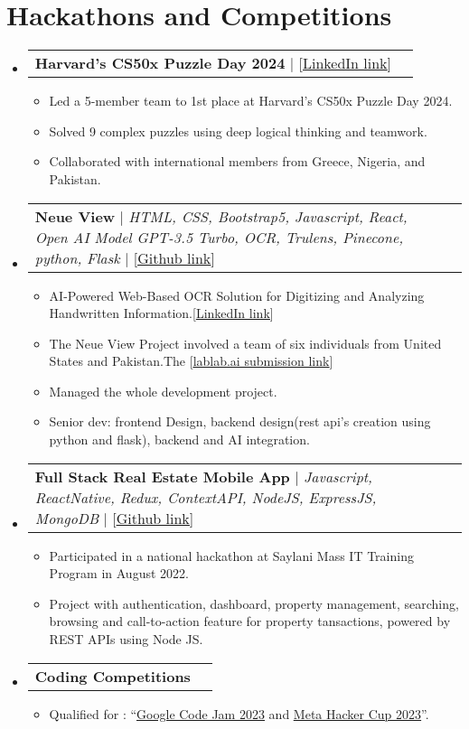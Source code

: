 \documentclass[letterpaper,11pt]{article}
\makeatletter
\newcommand{\resumeItem}[1]{
  \item\small{
    {#1 \vspace{-2pt}}
  }
}
\newcommand{\resumeProjectHeading}[2]{
    \item
    \begin{tabular*}{0.97\textwidth}{l@{\extracolsep{\fill}}r}
      \small#1 & #2 \\
    \end{tabular*}\vspace{-7pt}
}
\newcommand{\resumeSubHeadingListStart}{\begin{itemize}[leftmargin=0.15in, label={}]}
\newcommand{\resumeSubHeadingListEnd}{\end{itemize}}
\newcommand{\resumeItemListStart}{\begin{itemize}}
\newcommand{\resumeItemListEnd}{\end{itemize}\vspace{-5pt}}
\makeatother
\begin{document}
\section{\textbf{Hackathons and Competitions}}
\resumeSubHeadingListStart
\resumeProjectHeading
{\textbf{{Harvard's CS50x Puzzle Day 2024}} $|$ [{\href{https://www.linkedin.com/feed/update/urn:li:activity:7184212040717131778/}{\underline{LinkedIn link}}}]}{}
\resumeItemListStart
\resumeItem{Led a 5-member team to 1st place at Harvard's CS50x Puzzle Day 2024.}
\resumeItem{Solved 9 complex puzzles using deep logical thinking and teamwork.}
\resumeItem{Collaborated with international members from Greece, Nigeria, and Pakistan.}
\resumeItemListEnd
\resumeProjectHeading
{\textbf{{Neue View}} $|$ \emph{HTML, CSS, Bootstrap5, Javascript, React, Open AI Model GPT-3.5 Turbo, OCR, Trulens, Pinecone, python, Flask} $|$ [{\href{https://github.com/Ahmadjajja/neue-view}{\underline{Github link}}}]} {}
\resumeItemListStart
\resumeItem{AI-Powered Web-Based OCR Solution for Digitizing and Analyzing Handwritten Information.[{\href{https://www.linkedin.com/feed/update/urn:li:activity:7167991035099385856/}{\underline{LinkedIn link}}}]}
\resumeItem{The Neue View Project involved a team of six individuals from United States and Pakistan.The [{\href{https://lablab.ai/event/gpt-4-powered-app-creation-hackathon/neue-view/neue-view}{\underline{lablab.ai submission link}}}]}
\resumeItem{Managed the whole development project.}
\resumeItem{Senior dev: frontend Design, backend design(rest api's creation using python and flask), backend and AI integration.}
\resumeItemListEnd
\resumeProjectHeading
{\textbf{{Full Stack Real Estate Mobile App}} $|$ \emph{Javascript, ReactNative, Redux, ContextAPI, NodeJS,
    ExpressJS, MongoDB} $|$ [{\href{https://github.com/Ahmadjajja/Social_Real_Estate_System_Mobile_App_Frontend}{\underline{Github link}}}]}{}
\resumeItemListStart
\resumeItem{Participated in a national hackathon at Saylani Mass IT Training Program in August 2022.}
\resumeItem{Project with authentication, dashboard, property
  management, searching, browsing and call-to-action feature for property
  tansactions, powered by REST APIs using Node JS.}
\resumeItemListEnd
\resumeProjectHeading
{\textbf{{Coding Competitions}}}{}
\resumeItemListStart
\resumeItem{Qualified for : “{\href{https://www.linkedin.com/feed/update/urn:li:activity:7053083509342576640/}{\underline{Google Code Jam 2023}}} and {\href{https://github.com/Ahmadjajja/MetaHackerCup2023}{\underline{Meta Hacker Cup 2023}}}”.}
\resumeItemListEnd
\resumeSubHeadingListEnd
%
\end{document}
